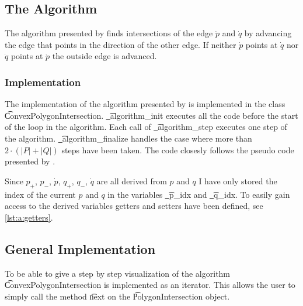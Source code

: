 \subsection*{The Algorithm}
	The algorithm presented by \citeauthor{o1982new} finds intersections of the edge $\dot{p}$ and $\dot{q}$ by advancing the edge that points in the direction of the other edge. If neither $\dot{p}$ points at $\dot{q}$ nor $\dot{q}$ points at $\dot{p}$ the outside edge is advanced.  

	\subsubsection*{Implementation}
	The implementation of the algorithm presented by \textcite{o1982new} is implemented in the class \t{ConvexPolygonIntersection}. \t{_algorithm_init} executes all the code before the start of the loop in the algorithm. Each call of \t{_algorithm_step} executes one step of the algorithm. \t{_algorithm_finalize} handles the case where more than $2 \cdot (|P| + |Q|)$ steps have been taken. The code closesly follows the pseudo code presented by \citeauthor{o1982new}.

	

	

	

	Since $p_+$, $p_-$, $\dot{p}$, $q_+$, $q_-$, $\dot{q}$ are all derived from $p$ and $q$ I have only stored the index of the current $p$ and $q$ in the variables \t{_p_idx} and \t{_q_idx}. To easily gain access to the derived variables getters and setters have been defined, see \autoref{lst:a:getters}.

	

\subsection*{General Implementation}
	To be able to give a step by step visualization of the algorithm \t{ConvexPolygonIntersection} is implemented as an iterator. This allows the user to simply call the method \t{next} on the \t{PolygonIntersection} object. 

